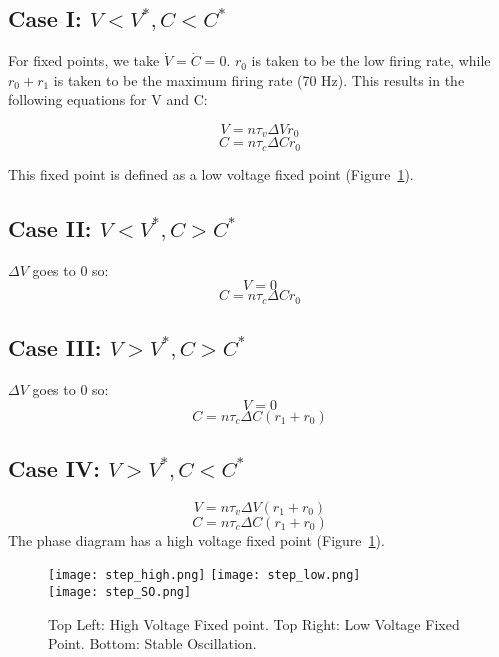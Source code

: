 \documentclass[11pt,letterpaper]{article}
\begin{document}
\subsection*{Case I: $V < V^*, C < C^*$}
For fixed points, we take $\dot{V} = \dot{C} = 0$. $r_0$ is taken to be the low firing rate, while $r_0 + r_1$ is taken to be the maximum firing rate (70 Hz). This results in the following equations for V and C:

\begin{equation}
V = n\tau _v \Delta V r_0
\end{equation}
\begin{equation}
C = n\tau _c \Delta C r_0
\end{equation}

This fixed point is defined as a low voltage fixed point (Figure~\ref{fig:step_function_plots}).

\subsection*{Case II: $V < V^*, C > C^*$}
$\Delta V$ goes to 0 so:
\begin{equation}
V = 0
\end{equation}
\begin{equation}
C = n\tau _c \Delta C r_0
\end{equation}
\subsection*{Case III: $V > V^*, C > C^*$}
$\Delta V$ goes to 0 so:
\begin{equation}
V = 0
\end{equation}
\begin{equation}
C = n\tau _c \Delta C(r_1 + r_0)
\end{equation}

\subsection*{Case IV: $V > V^*, C < C^*$}
\begin{equation}
V = n\tau_v \Delta V (r_1 + r_0)
\end{equation}
\begin{equation}
C = n\tau_c \Delta C (r_1 + r_0)
\end{equation}
The phase diagram has a high voltage fixed point (Figure~\ref{fig:step_function_plots}).

\begin{figure}[h!]
  \centering
  	\texttt{[image: step\_high.png]}
    \texttt{[image: step\_low.png]}\\
    \texttt{[image: step\_SO.png]}
  \caption{Top Left: High Voltage Fixed point. Top Right: Low Voltage Fixed Point. Bottom: Stable Oscillation.}
  \label{fig:step_function_plots}
\end{figure}
\end{document}
